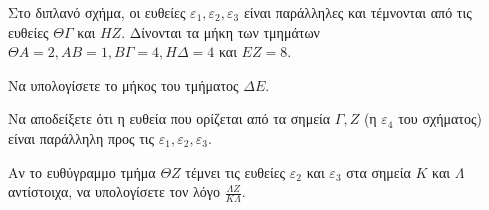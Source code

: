 Στο διπλανό σχήμα, οι ευθείες $\varepsilon_1, \varepsilon_2, \varepsilon_3$ είναι παράλληλες και τέμνονται από τις ευθείες $\Theta\Gamma$ και $HZ$. Δίνονται τα μήκη των τμημάτων $ΘΑ=2, ΑΒ=1, ΒΓ=4, ΗΔ=4$ και $ΕΖ=8$.
\begin{alist}
	\item[α)] Να υπολογίσετε το μήκος του τμήματος $\Delta E$. 
	\item[β)] Να αποδείξετε ότι η ευθεία που ορίζεται από τα σημεία $\Gamma, Z$ (η $\varepsilon_4$ του σχήματος) είναι παράλληλη προς τις $\varepsilon_1, \varepsilon_2, \varepsilon_3$. 
	\item[γ)] Αν το ευθύγραμμο τμήμα $\Theta Z$ τέμνει τις ευθείες $\varepsilon_2$ και $\varepsilon_3$ στα σημεία $K$ και $\Lambda$ αντίστοιχα, να υπολογίσετε τον λόγο $\frac{\Lambda Z}{K\Lambda}$. 
\end{alist}